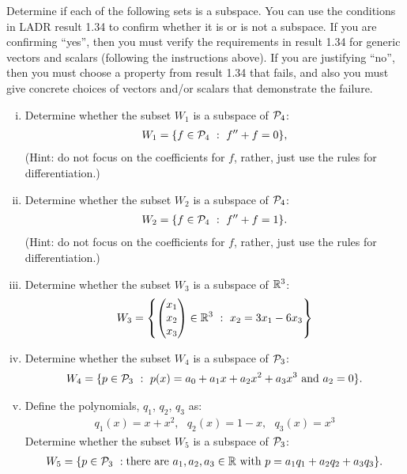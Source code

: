 \begin{question}
    \normalfont

    Determine if each of the following sets is a subspace.  You can use the conditions in LADR result 1.34 to confirm whether it is or is not a subspace.  If you are confirming ``yes'', then you must verify the requirements in result 1.34 for generic vectors and scalars (following the instructions above).  If you are justifying ``no'', then you must choose a property from result 1.34 that fails, and also you must give concrete choices of vectors and/or scalars that demonstrate the failure.
	
	
	\begin{enumerate}[(i)]
		\item Determine whether the subset $W_1$ is a subspace of $\P_4$:
		\begin{align*}
			W_1=\{ f\in \P_4\ : \ f''+f=0 \},
		\end{align*}
		(Hint: do not focus on the coefficients for $f$, rather, just use the rules for differentiation.)
		
		\vspace{.6cm}
		
		\item Determine whether the subset $W_2$  is a subspace of $\P_4$:
		\begin{align*}
			W_2=\{ f\in \P_4\ : \ f''+f=1 \}.
		\end{align*}
		(Hint: do not focus on the coefficients for $f$, rather, just use the rules for differentiation.)
		
		\vspace{.6cm}
		
		
		\item  Determine whether the subset $W_3$ is a subspace of $\real^3$:
		\begin{align*}
			W_3 = \left\{ \colvecthree{x_1}{x_2}{x_3}\in \real^3 \ :\ x_2 = 3x_1 - 6x_3  \right\}
		\end{align*}
		
		\vspace{.6cm}
		
		\item Determine whether the subset $W_4$  is a subspace of $\P_3$:
		\begin{align*}
			W_4 = \{ p\in\P_3\ : \ p(x) = a_0 + a_1x + a_2 x^2 + a_3x^3\ \text{and}\ a_2=0 \}.
		\end{align*}
		
		
		\vspace{.6cm}
		
		
		\item 
		Define the polynomials, $q_1$, $q_2$, $q_3$ as:
		\begin{align*}
			q_1(x) = x+x^2,\ \ \ q_2(x) = 1-x,\ \ \ q_3(x) = x^3
		\end{align*}
		Determine whether the subset $W_5$  is a subspace of $\P_3$:
		\begin{align*}
			W_5 = 
			\{ p\in\P_3\ : \text{there are}\ a_1,a_2,a_3\in\real\ \text{with}\ p=a_1 q_1 + a_2 q_2 + a_3 q_3 \}.
		\end{align*}
		
	\end{enumerate}
\end{question}

